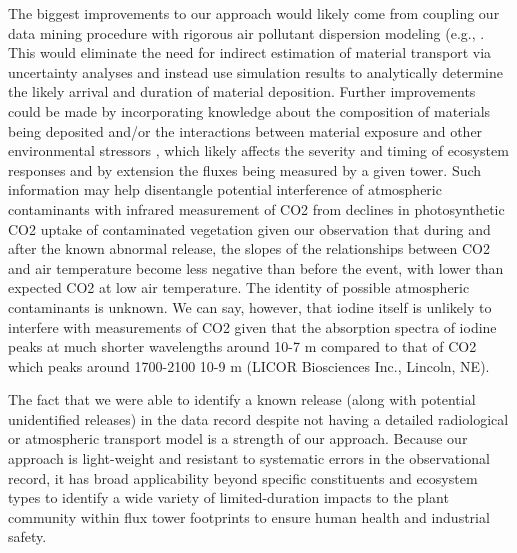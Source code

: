 \documentclass{article}
\begin{document}
The biggest improvements to our approach would likely come from coupling our data mining procedure with rigorous air pollutant dispersion modeling (e.g., \citep{meszarosPredictabilityDispersionFukushimaderived2016}. This would eliminate the need for indirect estimation of material transport via uncertainty analyses and instead use simulation results to analytically determine the likely arrival and duration of material deposition. Further improvements could be made by incorporating knowledge about the composition of materials being deposited \citep{international2006iaea, meszarosPredictabilityDispersionFukushimaderived2016} and/or the interactions between material exposure and other environmental stressors \citep{mousseauPlantsLightIonizing2020}, which likely affects the severity and timing of ecosystem responses and by extension the fluxes being measured by a given tower. Such information may help disentangle potential interference of atmospheric contaminants with infrared measurement of CO2 from declines in photosynthetic CO2 uptake of contaminated vegetation given our observation that during and after the known abnormal release, the slopes of the relationships between CO2 and air temperature become less negative than before the event, with lower than expected CO2 at low air temperature. The identity of possible atmospheric contaminants is unknown. We can say, however, that iodine itself is unlikely to interfere with measurements of CO2 given that the absorption spectra of iodine peaks at much shorter wavelengths around 10-7 m \citep{haynes2016crc} compared to that of CO2 which peaks around 1700-2100 10-9 m (LICOR Biosciences Inc., Lincoln, NE).

The fact that we were able to identify a known release (along with potential unidentified releases) in the data record despite not having a detailed radiological or atmospheric transport model is a strength of our approach. Because our approach is light-weight and resistant to systematic errors in the observational record, it has broad applicability beyond specific constituents and ecosystem types to identify a wide variety of limited-duration impacts to the plant community within flux tower footprints to ensure human health and industrial safety.


\end{document}
